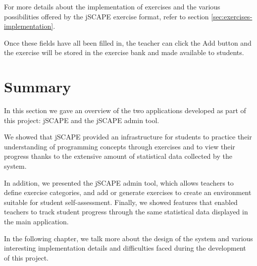 For more details about the implementation of exercises and the various possibilities offered by the jSCAPE exercise format, refer to section \ref{sec:exercises-implementation}.\newline

Once these fields have all been filled in, the teacher can click the Add button and the exercise will be stored in the exercise bank and made available to students.

\section{Summary}
In this section we gave an overview of the two applications developed as part of this project: jSCAPE and the jSCAPE admin tool.\newline

We showed that jSCAPE provided an infrastructure for students to practice their understanding of programming concepts through exercises and to view their progress thanks to the extensive amount of statistical data collected by the system.\newline

In addition, we presented the jSCAPE admin tool, which allows teachers to define exercise categories, and add or generate exercises to create an environment suitable for student self-assessment. Finally, we showed features that enabled teachers to track student progress through the same statistical data displayed in the main application. \newline

In the following chapter, we talk more about the design of the system and various interesting implementation details and difficulties faced during the development of this project.

